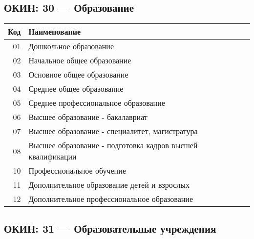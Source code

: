 \documentclass[10pt, a4paper, titlepage]{article}
\begin{document}
\subsection{ОКИН: 30 --- Образование}

\begin{center}
    \begin{tabular}{rp{}}
        \hline
        \textbf{Код} & \textbf{Наименование} \\ \hline
        01 & Дошкольное образование \\
        02 & Начальное общее образование \\
        03 & Основное общее образование \\
        04 & Среднее общее образование \\
        05 & Среднее профессиональное образование \\
        06 & Высшее образование - бакалавриат \\
        07 & Высшее образование - специалитет, магистратура \\
        08 & Высшее образование - подготовка кадров высшей квалификации \\
        10 & Профессиональное обучение \\
        11 & Дополнительное образование детей и взрослых \\
        12 & Дополнительное профессиональное образование \\
    \end{tabular}
\end{center}

\subsection{ОКИН: 31 --- Образовательные учреждения}
\end{document}
